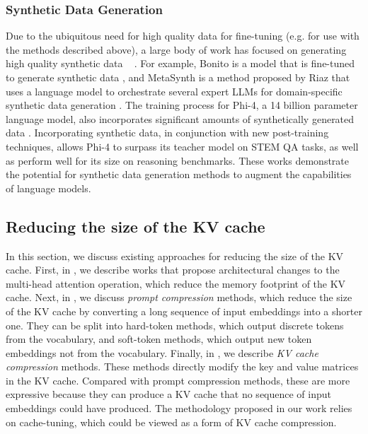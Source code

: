 \subsubsection{Synthetic Data Generation}
Due to the ubiquitous need for high quality data for fine-tuning (e.g. for use with the methods described above), a large body of work has focused on generating high quality synthetic data ~\cite{nayak2024learning} \cite{abdin2024phi} \cite{gandhi2024datatune} \cite{riaz2025metasynth}. For example, Bonito is a model that is fine-tuned to generate synthetic data \cite{nayak2024learning}, and MetaSynth is a method proposed by Riaz \etal that uses a language model to orchestrate several expert LLMs for domain-specific synthetic data generation \cite{riaz2025metasynth}. The training process for Phi-4, a 14 billion parameter language model, also incorporates significant amounts of synthetically generated data \cite{abdin2024phi}. Incorporating synthetic data, in conjunction with new post-training techniques, allows Phi-4 to surpass its teacher model on STEM QA tasks, as well as perform well for its size on reasoning benchmarks. These works demonstrate the potential for synthetic data generation methods to augment the capabilities of language models.
\subsection{Reducing the size of the KV cache}
\label{app:related-work-reducekv}
In this section, we discuss existing approaches for reducing the size of the KV cache.
First, in , we describe works that propose architectural changes to the multi-head attention operation, which reduce the memory footprint of the KV cache. Next, in , we discuss \textit{prompt compression} methods, which reduce the size of the KV cache by converting a long sequence of input embeddings into a shorter one. They can be split into hard-token methods, which output discrete tokens from the vocabulary, and soft-token methods, which output new token embeddings not from the vocabulary.
Finally, in , we describe \textit{KV cache compression} methods. These methods directly modify the key and value matrices in the KV cache. Compared with prompt compression methods, these are more expressive because they can produce a KV cache that no sequence of input embeddings could have produced.
The methodology proposed in our work relies on cache-tuning, which could be viewed as a form of KV cache compression.
